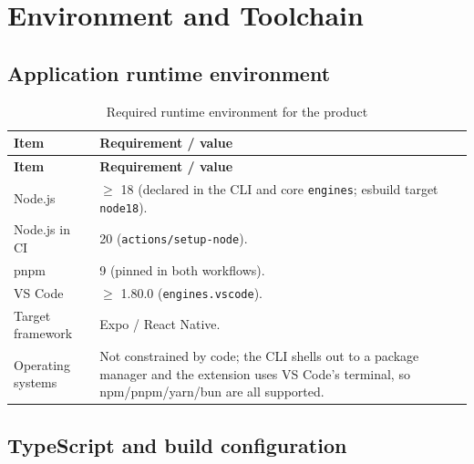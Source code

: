 \chapter{Environment and Toolchain}
\label{app:environment}

\section{Application runtime environment}

\begin{longtable}{@{}L{5.4cm}L{8.8cm}@{}}
\caption{Required runtime environment for the product}\\
\toprule
\textbf{Item} & \textbf{Requirement / value} \\
\midrule
\endfirsthead
\toprule
\textbf{Item} & \textbf{Requirement / value} \\
\midrule
\endhead
Node.js & $\geq$ 18 (declared in the CLI and core \texttt{engines}; esbuild target
\texttt{node18}). \\
Node.js in CI & 20 (\texttt{actions/setup-node}). \\
pnpm & 9 (pinned in both workflows). \\
VS Code & $\geq$ 1.80.0 (\texttt{engines.vscode}). \\
Target framework & Expo / React Native. \\
Operating systems & Not constrained by code; the CLI shells out to a package
manager and the extension uses VS Code's terminal, so npm/pnpm/yarn/bun are all
supported. \\
\bottomrule
\end{longtable}

\section{TypeScript and build configuration}

